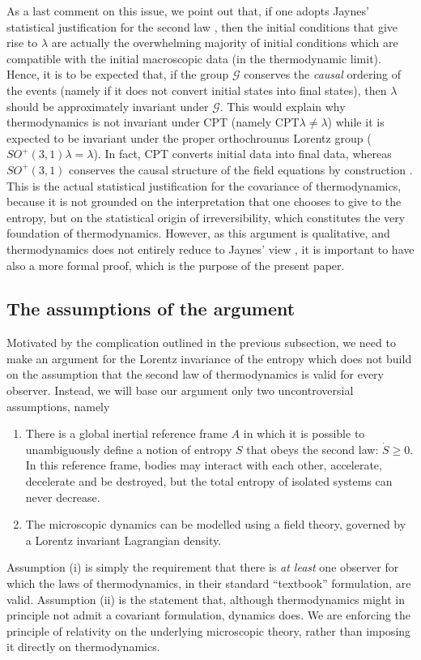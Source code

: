 \documentclass[twocolumn,usenatbib]{mnras2}
\begin{document}
As a last comment on this issue, we point out that, if one adopts Jaynes' statistical justification for the second law \citep{Jaynes1965}, then the initial conditions that give rise to $\lambda$ are actually the overwhelming majority of initial conditions which are compatible with the initial macroscopic data (in the thermodynamic limit). Hence, it is to be expected that, if the group $\mathcal{G}$ conserves the \textit{causal} ordering of the events (namely if it does not convert initial states into final states), then $\lambda$ should be approximately invariant under $\mathcal{G}$. This would explain why thermodynamics is not invariant under CPT (namely $\text{CPT}  \lambda \neq \lambda$) while it is expected to be invariant under the proper orthochrounus Lorentz group ($SO^+(3,1) \lambda = \lambda$). In fact, CPT converts initial data into final data, whereas $SO^+(3,1)$ conserves the causal structure of the field equations by construction \citep{Peskin_book}. This is the actual statistical justification for the covariance of thermodynamics, because it is not grounded on the interpretation that one chooses to give to the entropy, but on the statistical origin of irreversibility, which constitutes the very foundation of thermodynamics. However, as this argument is qualitative, and thermodynamics does not entirely reduce to Jaynes' view \citep{Rigol2008,Gogoglin2016}, it is important to have also a more formal proof, which is the purpose of the present paper.




\subsection{The assumptions of the argument}\label{assumptionsSSSSS}

Motivated by the complication outlined in the previous subsection, we need to make an argument for the Lorentz invariance of the entropy which does not build on the assumption that the second law of thermodynamics is valid for every observer. Instead, we will base our argument only two uncontroversial assumptions, namely
\begin{enumerate}
\item[(i) -] There is a global inertial reference frame $A$ in which it is possible to unambiguously define a notion of entropy $S$ that obeys the second law: $\dot{S} \geq 0$. In this reference frame, bodies may interact with each other, accelerate, decelerate and be destroyed, but the total entropy of isolated systems can never decrease.
\item[(ii) -] The microscopic dynamics can be modelled using a field theory, governed by a Lorentz invariant Lagrangian density.
\end{enumerate}
Assumption (i) is simply the requirement that there is \textit{at least} one observer for which the laws of thermodynamics, in their standard  ``textbook'' formulation, are valid. Assumption (ii) is the statement that, although thermodynamics might in principle not admit a covariant formulation, dynamics does. We are enforcing the principle of relativity on the underlying microscopic theory, rather than imposing it directly on thermodynamics.
\end{document}
